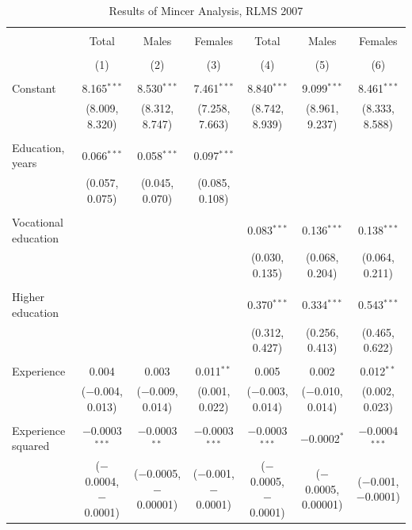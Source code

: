 \documentclass[alpha-refs]{wiley-article-01g}
\begin{document}
\begin{landscape}
	
	\fontsize{9}{11}
	\selectfont
	
	\begin{table}[!htbp] \centering 
\renewcommand{\arraystretch}{1.0}
		\caption{Results of Mincer Analysis, RLMS 2007} 
		\label{} 
		\begin{tabular}{@{\extracolsep{5pt}}lcccccc} 
			\\[-.8ex]\hline 
			\hline \\[-.8ex] 
			& Total & Males & Females & Total & Males & Females \\ 
			\\[-.8ex] & (1) & (2) & (3) & (4) & (5) & (6)\\ 
			\hline \\[-.8ex] 
			Constant & 8.165$^{***}$ & 8.530$^{***}$ & 7.461$^{***}$ & 8.840$^{***}$ & 9.099$^{***}$ & 8.461$^{***}$ \\ 
			& (8.009, 8.320) & (8.312, 8.747) & (7.258, 7.663) & (8.742, 8.939) & (8.961, 9.237) & (8.333, 8.588) \\ 
			& & & & & & \\ 
			Education, years & 0.066$^{***}$ & 0.058$^{***}$ & 0.097$^{***}$ &  &  &  \\ 
			& (0.057, 0.075) & (0.045, 0.070) & (0.085, 0.108) &  &  &  \\ 
			& & & & & & \\ 
			Vocational education &  &  &  & 0.083$^{***}$ & 0.136$^{***}$ & 0.138$^{***}$ \\ 
			&  &  &  & (0.030, 0.135) & (0.068, 0.204) & (0.064, 0.211) \\ 
			& & & & & & \\ 
			Higher education &  &  &  & 0.370$^{***}$ & 0.334$^{***}$ & 0.543$^{***}$ \\ 
			&  &  &  & (0.312, 0.427) & (0.256, 0.413) & (0.465, 0.622) \\ 
			& & & & & & \\ 
			Experience & 0.004 & 0.003 & 0.011$^{**}$ & 0.005 & 0.002 & 0.012$^{**}$ \\ 
			& ($-$0.004, 0.013) & ($-$0.009, 0.014) & (0.001, 0.022) & ($-$0.003, 0.014) & ($-$0.010, 0.014) & (0.002, 0.023) \\ 
			& & & & & & \\ 
			Experience squared & $-$0.0003$^{***}$ & $-$0.0003$^{**}$ & $-$0.0003$^{***}$ & $-$0.0003$^{***}$ & $-$0.0002$^{*}$ & $-$0.0004$^{***}$ \\ 
			& ($-$0.0004, $-$0.0001) & ($-$0.0005, $-$0.00001) & ($-$0.001, $-$0.0001) & ($-$0.0005, $-$0.0001) & ($-$0.0005, 0.00001) & ($-$0.001, $-$0.0001) \\ 

\end{tabular}
\end{table}
\end{landscape}
\end{document}
